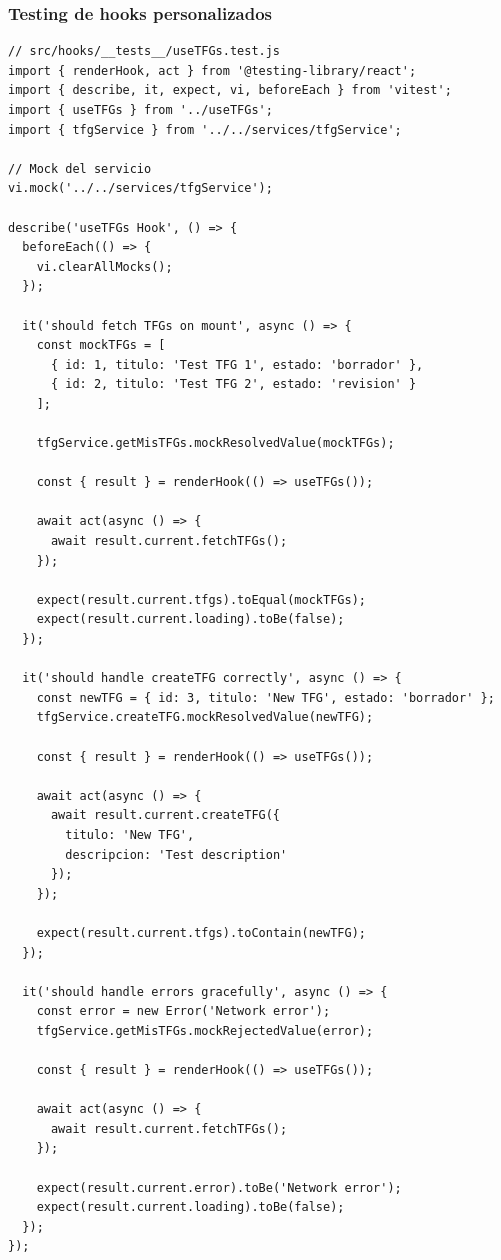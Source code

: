 \documentclass[12pt,a4paper,oneside]{report}
\begin{document}
\subsubsection{Testing de hooks
personalizados}\label{testing-de-hooks-personalizados}

\begin{lstlisting}
// src/hooks/__tests__/useTFGs.test.js
import { renderHook, act } from '@testing-library/react';
import { describe, it, expect, vi, beforeEach } from 'vitest';
import { useTFGs } from '../useTFGs';
import { tfgService } from '../../services/tfgService';

// Mock del servicio
vi.mock('../../services/tfgService');

describe('useTFGs Hook', () => {
  beforeEach(() => {
    vi.clearAllMocks();
  });

  it('should fetch TFGs on mount', async () => {
    const mockTFGs = [
      { id: 1, titulo: 'Test TFG 1', estado: 'borrador' },
      { id: 2, titulo: 'Test TFG 2', estado: 'revision' }
    ];

    tfgService.getMisTFGs.mockResolvedValue(mockTFGs);

    const { result } = renderHook(() => useTFGs());

    await act(async () => {
      await result.current.fetchTFGs();
    });

    expect(result.current.tfgs).toEqual(mockTFGs);
    expect(result.current.loading).toBe(false);
  });

  it('should handle createTFG correctly', async () => {
    const newTFG = { id: 3, titulo: 'New TFG', estado: 'borrador' };
    tfgService.createTFG.mockResolvedValue(newTFG);

    const { result } = renderHook(() => useTFGs());

    await act(async () => {
      await result.current.createTFG({
        titulo: 'New TFG',
        descripcion: 'Test description'
      });
    });

    expect(result.current.tfgs).toContain(newTFG);
  });

  it('should handle errors gracefully', async () => {
    const error = new Error('Network error');
    tfgService.getMisTFGs.mockRejectedValue(error);

    const { result } = renderHook(() => useTFGs());

    await act(async () => {
      await result.current.fetchTFGs();
    });

    expect(result.current.error).toBe('Network error');
    expect(result.current.loading).toBe(false);
  });
});
\end{lstlisting}
\end{document}
